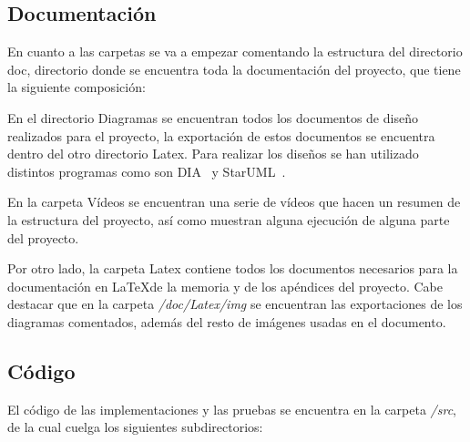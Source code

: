 \subsection{Documentación}
En cuanto a las carpetas se va a empezar comentando la estructura del directorio doc, directorio donde se encuentra toda la documentación del proyecto, que tiene la siguiente composición:

En el directorio Diagramas se encuentran todos los documentos de diseño realizados para el proyecto, la exportación de estos documentos se encuentra dentro del otro directorio Latex. Para realizar los diseños se han utilizado distintos programas como son DIA~\cite{dia} y StarUML~\cite{staruml}.

En la carpeta Vídeos se encuentran una serie de vídeos que hacen un resumen de la estructura del proyecto, así como muestran alguna ejecución de alguna parte del proyecto.

Por otro lado, la carpeta Latex contiene todos los documentos necesarios para la documentación en \LaTeX de la memoria y de los apéndices del proyecto. Cabe destacar que en la carpeta \textit{/doc/Latex/img} se encuentran las exportaciones de los diagramas comentados, además del resto de imágenes usadas en el documento.

\subsection{Código}
El código de las implementaciones y las pruebas se encuentra en la carpeta \textit{/src}, de la cual cuelga los siguientes subdirectorios:

